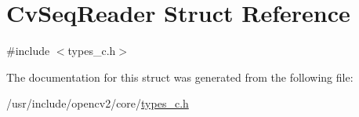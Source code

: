 \hypertarget{structCvSeqReader}{\section{Cv\-Seq\-Reader Struct Reference}
\label{structCvSeqReader}
}


{\ttfamily \#include $<$types\-\_\-c.\-h$>$}



The documentation for this struct was generated from the following file\-:\begin{DoxyCompactItemize}
\item 
/usr/include/opencv2/core/\hyperlink{core_2types__c_8h}{types\-\_\-c.\-h}\end{DoxyCompactItemize}
